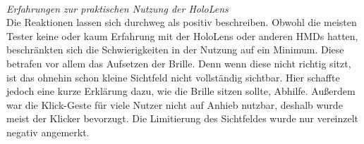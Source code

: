 \vspace{8px}
\begin{center}
	\\
\end{center}
\vspace{6px}

\textit{Erfahrungen zur praktischen Nutzung der HoloLens}\\
Die Reaktionen lassen sich durchweg als positiv beschreiben. Obwohl die meisten Tester keine oder kaum Erfahrung mit der HoloLens oder anderen HMDs hatten, beschränkten sich die Schwierigkeiten in der Nutzung auf ein Minimum. Diese betrafen vor allem das Aufsetzen der Brille. Denn wenn diese nicht richtig sitzt, ist das ohnehin schon kleine Sichtfeld nicht vollständig sichtbar. Hier schaffte jedoch eine kurze Erklärung dazu, wie die Brille sitzen sollte, Abhilfe. Außerdem war die Klick-Geste für viele Nutzer nicht auf Anhieb nutzbar, deshalb wurde meist der Klicker bevorzugt. Die Limitierung des Sichtfeldes wurde nur vereinzelt negativ angemerkt.\\

